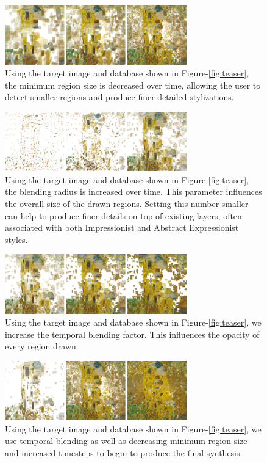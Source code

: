 \documentclass[a4paper,10pt,final]{ThesisStyle}
\begin{document}
\begin{figure}[ht]
  \centering
  \includegraphics[width=3.1in]{images/decreasing-minimum-size-2.png}
  
  \caption{Using the target image and database shown in Figure-\ref{fig:teaser}, the minimum region size is decreased over time, allowing the user to detect smaller regions and produce finer detailed stylizations.}
  \label{fig:minimum-size}
\end{figure}
\begin{figure}[ht]
  \centering
  \includegraphics[width=3.1in]{images/blending-radius-2.png}
  
  \caption{Using the target image and database shown in Figure-\ref{fig:teaser}, the blending radius is increased over time.  This parameter influences the overall size of the drawn regions.  Setting this number smaller can help to produce finer details on top of existing layers, often associated with both Impressionist and Abstract Expressionist styles.}
  \label{fig:blending-radius}
\end{figure}
\begin{figure}[ht]
  \centering
  \includegraphics[width=3.1in]{images/temporal-blending.png}
  
  \caption{Using the target image and database shown in Figure-\ref{fig:teaser}, we increase the temporal blending factor.  This influences the opacity of every region drawn. }
  \label{fig:temporal-blending}
\end{figure}
\begin{figure}[ht]
  \centering
  \includegraphics[width=3.1in]{images/temporal-blending-changing-params.png}
  
  \caption{Using the target image and database shown in Figure-\ref{fig:teaser}, we use temporal blending as well as decreasing minimum region size and increased timesteps to begin to produce the final synthesis.}
  \label{fig:temporal-blending-changing-parameters}
\end{figure}
\end{document}
